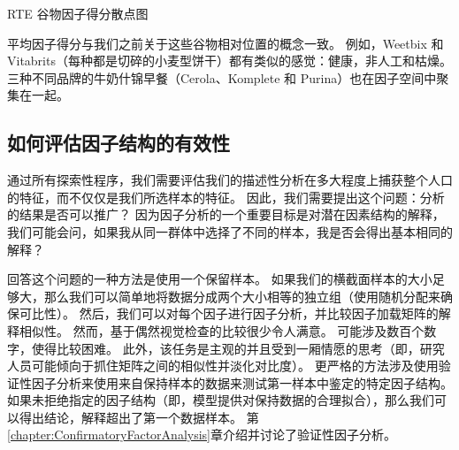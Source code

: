 \begin{table}[htb]
\begin{floatrow}
{{\begin{subfloatrow}
{
                    }{\caption{}}
                \end{subfloatrow}
            }{
                \vspace{-1em}
                \caption{RTE 谷物因子得分散点图}
                \label{fig:EFA-scatter-plots-of-factor-scores-for-rte-cereals}
            }
        }
    \end{floatrow}
\end{table}

平均因子得分与我们之前关于这些谷物相对位置的概念一致。
例如，Weetbix 和 Vitabrits（每种都是切碎的小麦型饼干）都有类似的感觉：健康，非人工和枯燥。
三种不同品牌的牛奶什锦早餐（Cerola、Komplete 和 Purina）也在因子空间中聚集在一起。

\subsection{如何评估因子结构的有效性}

通过所有探索性程序，我们需要评估我们的描述性分析在多大程度上捕获整个人口的特征，而不仅仅是我们所选样本的特征。
因此，我们需要提出这个问题：分析的结果是否可以推广？ 
因为因子分析的一个重要目标是对潜在因素结构的解释，
我们可能会问，如果我从同一群体中选择了不同的样本，我是否会得出基本相同的解释？

回答这个问题的一种方法是使用一个保留样本。
如果我们的横截面样本的大小足够大，那么我们可以简单地将数据分成两个大小相等的独立组（使用随机分配来确保可比性）。
然后，我们可以对每个因子进行因子分析，并比较因子加载矩阵的解释相似性。
然而，基于偶然视觉检查的比较很少令人满意。
可能涉及数百个数字，使得比较困难。
此外，该任务是主观的并且受到一厢情愿的思考（即，研究人员可能倾向于抓住矩阵之间的相似性并淡化对比度）。
更严格的方法涉及使用验证性因子分析来使用来自保持样本的数据来测试第一样本中鉴定的特定因子结构。
如果未拒绝指定的因子结构（即，模型提供对保持数据的合理拟合），那么我们可以得出结论，解释超出了第一个数据样本。
第\ref{chapter:ConfirmatoryFactorAnalysis}章介绍并讨论了验证性因子分析。

